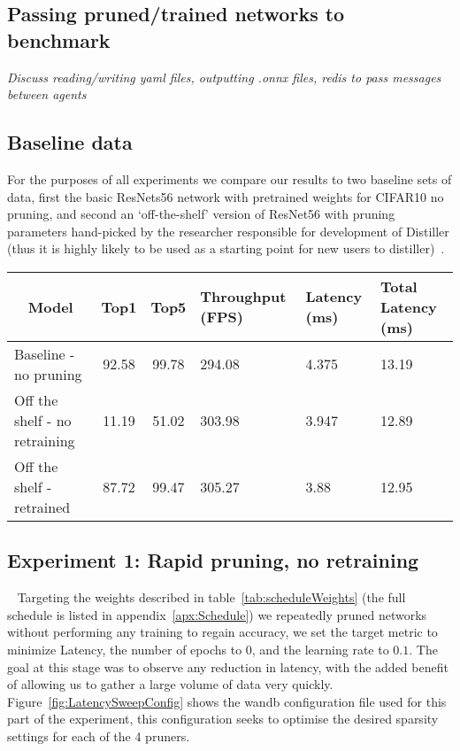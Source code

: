\documentclass[../Dissertation.tex]{subfiles}
\begin{document}
\doublespacing

\subsection{Passing pruned/trained networks to benchmark}
\emph{\color{red}Discuss reading/writing yaml files, outputting .onnx files, redis to pass messages between agents}

\subsection{Baseline data}\label{sec:baselineData}
For the purposes of all experiments we compare our results to two baseline sets of data, first the basic ResNets56 network with pretrained weights for CIFAR10 no pruning, and second an `off-the-shelf' version of ResNet56 with pruning parameters hand-picked by the researcher responsible for development of Distiller (thus it is highly likely to be used as a starting point for new users to distiller)~\autocite{liPruningFiltersEfficient2017}.

\begin{table}[H]
    \begin{tabular}{@{}lccp{25mm}p{23mm}p{28mm}@{}}
    \toprule
    \multicolumn{1}{c}{\textbf{Model}} & \textbf{Top1} & \textbf{Top5} & \textbf{Throughput (FPS)} & \textbf{Latency (ms)} & \textbf{Total Latency (ms)} \\ \midrule
    Baseline - no pruning              & 92.58         & 99.78         & 294.08                    & 4.375                 & 13.19                       \\
    Off the shelf - no retraining      & 11.19         & 51.02         & 303.98                    & 3.947                 & 12.89                       \\
    Off the shelf - retrained          &  87.72        & 99.47         & 305.27                    & 3.88                  & 12.95                           \\ \bottomrule
    \end{tabular}
\end{table}

\subsection{Experiment 1: Rapid pruning, no retraining}~\label{sec:ex1}
Targeting the weights described in table~\ref{tab:scheduleWeights} (the full schedule is listed in appendix~\ref{apx:Schedule}) we repeatedly pruned networks without performing any training to regain accuracy, we set the target metric to minimize Latency, the number of epochs to $0$, and the learning rate to $0.1$.
The goal at this stage was to observe any reduction in latency, with the added benefit of allowing us to gather a large volume of data very quickly.
Figure~\ref{fig:LatencySweepConfig} shows the \acrshort{wandb} configuration file used for this part of the experiment, this configuration seeks to optimise the desired sparsity settings for each of the 4 pruners.
\end{document}
